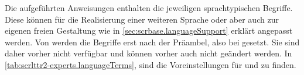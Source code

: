 \begin{Declaration}
\end{Declaration}
Die aufgeführten Anweisungen enthalten die jeweiligen sprachtypischen
Begriffe. Diese können für die Realisierung einer
weiteren Sprache oder aber auch zur eigenen freien Gestaltung wie in
\autoref{sec:scrbase.languageSupport} erklärt angepasst werden. Von
\KOMAScript{} werden die Begriffe erst nach der Präambel, also bei
 gesetzt. Sie sind daher vorher nicht
verfügbar und können vorher auch nicht geändert werden. In
\autoref{tab:scrlttr2-experts.languageTerms},
 sind die Voreinstellungen
für  und  zu finden.%
\EndIndexGroup

